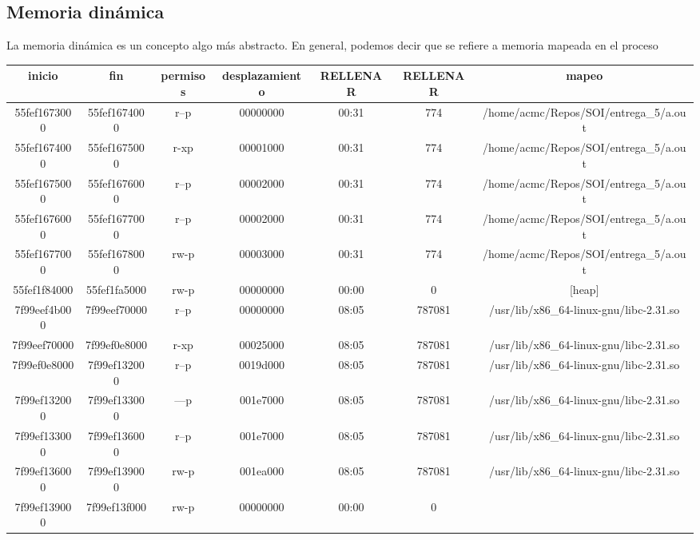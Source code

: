 \documentclass[a4paper]{article}
\begin{document}
\subsection{Memoria dinámica}

La memoria dinámica es un concepto algo más abstracto. En general, podemos decir que se refiere a memoria mapeada en el proceso 

\begin{center}
\def\arraystretch{1.5}
\begin{tabular}{ | c | c | c | c | c | c | c | }
    \hline
     inicio & fin & permisos & desplazamiento & RELLENAR & RELLENAR &mapeo \\ \hline
     55fef1673000 & 55fef1674000 & r--p & 00000000 & 00:31 & 774 & /home/acmc/Repos/SOI/entrega\_5/a.out \\ \hline
55fef1674000 & 55fef1675000 & r-xp & 00001000 & 00:31 & 774 & /home/acmc/Repos/SOI/entrega\_5/a.out \\ \hline
55fef1675000 & 55fef1676000 & r--p & 00002000 & 00:31 & 774 & /home/acmc/Repos/SOI/entrega\_5/a.out \\ \hline
55fef1676000 & 55fef1677000 & r--p & 00002000 & 00:31 & 774 & /home/acmc/Repos/SOI/entrega\_5/a.out \\ \hline
55fef1677000 & 55fef1678000 & rw-p & 00003000 & 00:31 & 774 & /home/acmc/Repos/SOI/entrega\_5/a.out \\ \hline
55fef1f84000 & 55fef1fa5000 & rw-p & 00000000 & 00:00 & 0 & [heap] \\ \hline
7f99eef4b000 & 7f99eef70000 & r--p & 00000000 & 08:05 & 787081 & /usr/lib/x86\_64-linux-gnu/libc-2.31.so \\ \hline
7f99eef70000 & 7f99ef0e8000 & r-xp & 00025000 & 08:05 & 787081 & /usr/lib/x86\_64-linux-gnu/libc-2.31.so \\ \hline
7f99ef0e8000 & 7f99ef132000 & r--p & 0019d000 & 08:05 & 787081 & /usr/lib/x86\_64-linux-gnu/libc-2.31.so \\ \hline
7f99ef132000 & 7f99ef133000 & ---p & 001e7000 & 08:05 & 787081 & /usr/lib/x86\_64-linux-gnu/libc-2.31.so \\ \hline
7f99ef133000 & 7f99ef136000 & r--p & 001e7000 & 08:05 & 787081 & /usr/lib/x86\_64-linux-gnu/libc-2.31.so \\ \hline
7f99ef136000 & 7f99ef139000 & rw-p & 001ea000 & 08:05 & 787081 & /usr/lib/x86\_64-linux-gnu/libc-2.31.so \\ \hline
7f99ef139000 & 7f99ef13f000 & rw-p & 00000000 & 00:00 & 0 &  \\ \hline

\end{tabular}
\end{center}
\end{document}
